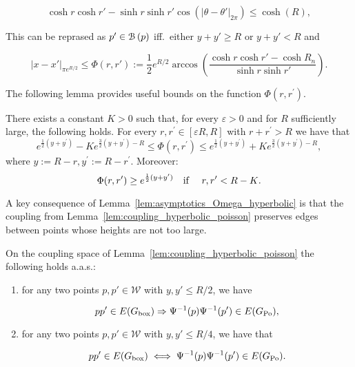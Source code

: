 $$
	\cosh r \cosh r' - \sinh r \sinh r'\cos\left( |\theta-\theta'|_{2\pi} \right) \le \cosh(R),
$$

\noindent
This can be reprased as $p'\in {\mathcal B}\left(p\right)$ iff.~either $y+y'\geq R$ or $y+y'<R$ and 


\begin{equation}\label{eq:def_Omega_hyperbolic}
	|x-x'|_{\pi e^{R/2}} \leq \Phi(r,r') := \frac{1}{2}e^{R/2} \arccos\left( \frac{\cosh r \cosh r' - \cosh R_n}
	{\sinh r \sinh r'} \right).
\end{equation}

The following lemma provides useful bounds on the function $\Phi(r,r^\prime)$.

\begin{lemma}\label{lem:asymptotics_Omega_hyperbolic}
There exists a constant $K>0$ such that, for every $\varepsilon > 0$ and for $R$ sufficiently large, the following holds.
For every $r,r^\prime \in [\varepsilon R,R]$ with $r + r^\prime > R$ we have that 
\begin{equation}\label{eq:asymp1}
	e^{\frac{1}{2}(y+y^\prime)} - K e^{\frac{3}{2}(y+y^\prime) - R} \leq \Phi(r, r^\prime) 
	\leq  e^{\frac{1}{2}(y+y^\prime)} + K e^{\frac{3}{2}(y+y^\prime) - R},
\end{equation}
where $y := R - r, y^\prime := R - r^\prime$. 
Moreover:
\begin{equation}\label{eq:asymp2} 
\Phi(r,r^\prime) \geq e^{\frac12(y+y^\prime)} \quad \text{if \quad $r, r^\prime < R - K$.} 
\end{equation}
\end{lemma}

A key consequence of Lemma~\ref{lem:asymptotics_Omega_hyperbolic} is that the coupling from Lemma~\ref{lem:coupling_hyperbolic_poisson} 
preserves edges between points whose heights are not too large.  

\begin{lemma}\label{lem:coupling_edges}
On the coupling space of Lemma~\ref{lem:coupling_hyperbolic_poisson} the following holds a.a.s.:
\begin{enumerate}
\item for any two points $p, p' \in \mathcal{W}$ with $y, y'\le R/2$, we have 

$$pp' \in E(G_{\text{box}}) \Rightarrow \Psi^{-1}(p)\Psi^{-1}(p') \in E(G_{\text{Po}}), $$ 

\item for any two points $p, p' \in \mathcal{W}$ with $y, y' \le R/4$, we have that 

$$pp' \in E(G_{\text{box}}) \iff \Psi^{-1}(p)\Psi^{-1}(p') \in E(G_{\text{Po}}).$$

\end{enumerate}
\end{lemma}


